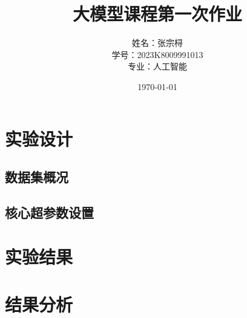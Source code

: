 \documentclass[a4paper,12pt]{ctexart} %
\title{\textbf{大模型课程第一次作业}}
\author{姓名：张宗桪 \\ 学号：2023K8009991013 \\ 专业：人工智能}
\date{\today}
\begin{document}
\pagestyle{plain} %

\maketitle
\thispagestyle{empty} %
\newpage

\tableofcontents
\newpage
\section{实验设计}
\subsection{数据集概况}
\subsection{核心超参数设置}
\section{实验结果}
\section{结果分析}
\end{document}
